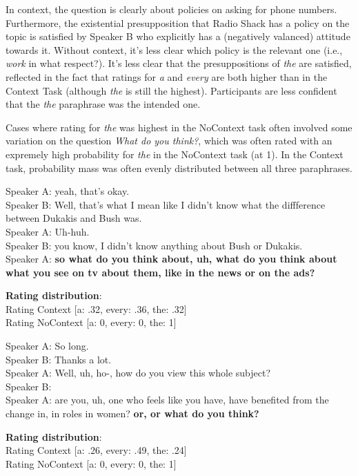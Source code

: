 \documentclass[12pt,letterpaper,table,svgnames,dvipsnames]{article}
\begin{document}
In context, the question is clearly about policies on asking for phone numbers. Furthermore, the existential presupposition that Radio Shack has a policy on the topic is satisfied by Speaker B who explicitly has a (negatively valanced) attitude towards it. Without context, it's less clear which policy is the relevant one (i.e., \emph{work} in what respect?). It's less clear that the presuppositions of \emph{the} are satisfied, reflected in the fact that ratings for \emph{a} and \emph{every} are both higher than in the Context Task (although \emph{the} is still the highest). Participants are less confident that the \emph{the} paraphrase was the intended one. 

Cases where rating for \emph{the} was highest in the NoContext task often involved some variation on the question \emph{What do you think?}, which was often rated with an expremely high probability for \emph{the} in the NoContext task (at 1). In the Context task, probability mass was often evenly distributed between all three paraphrases.

\begin{exe}
\ex {}
    \begin{xlist}
    \ex {}
    Speaker A: yeah, that's okay.\\
    Speaker B: Well, that's what I mean like I didn't know what the diffference between Dukakis and Bush was.\\
    Speaker A: Uh-huh.\\
    Speaker B: you know, I didn't know anything about Bush or Dukakis.\\
    Speaker A: \textbf{so what do you think about, uh, what do you think about what you see on tv about them, like in the news or on the ads?}
    
    \ex \textbf{Rating distribution}:\\
    Rating Context [a: .32, every: .36, the: .32]\\
    Rating NoContext [a: 0, every: 0, the: 1]
    \end{xlist}
\end{exe}


\begin{exe}
\ex {}
    \begin{xlist}
    \ex {}
    Speaker A: So long.\\
    Speaker B: Thanks a lot. \\
    Speaker A: Well, uh, ho-, how do you view this whole subject?\\
    Speaker B: \\
    Speaker A: are you, uh, one who feels like you have, have benefited from the change in, in roles in women? \textbf{or, or what do you think?}
    
    \ex \textbf{Rating distribution}:\\
    Rating Context [a: .26, every: .49, the: .24]\\
    Rating NoContext [a: 0, every: 0, the: 1]
    \end{xlist}
\end{exe}
\end{document}
